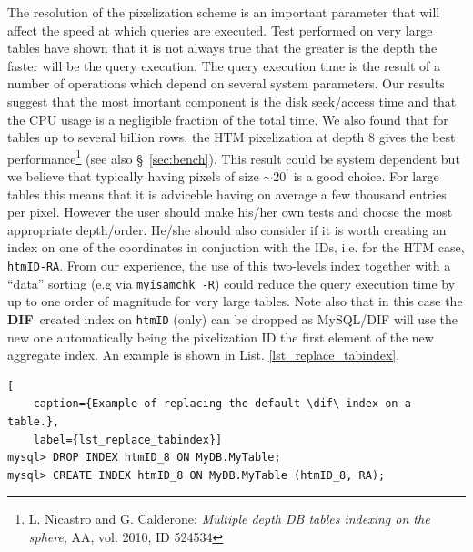 \documentclass[10pt,titlepage]{article}
\newcommand{\dif}{\textbf{\small DIF}}
\begin{document}
\noindent
The resolution of the pixelization scheme is an important parameter
that will affect the speed at which queries are executed.
Test performed on very large tables have shown that it is not always
true that the greater is the depth the faster will be the query execution.
The query execution time is the result of a number of
operations which depend on several system parameters.
Our results suggest that the most imortant component is the disk seek/access
time and that the CPU usage is a negligible fraction of the total time.
We also found that for tables up to several billion rows, the HTM pixelization
at depth 8 gives the best performance\footnote{L. Nicastro and G. Calderone:
\emph{Multiple depth DB tables indexing on the sphere}, AA, vol. 2010, ID 524534}
(see also \S\ \ref{sec:bench}). This result could be system dependent
but we believe that typically having pixels of size $\sim 20^\prime$ is a
good choice. For large tables this means
that it is adviceble having on average a few thousand entries per pixel.
However the user should make his/her own tests
and choose the most appropriate depth/order. He/she should also consider
if it is worth creating an index on one of the coordinates in conjuction with the
IDs, i.e. for the HTM case, \texttt{htmID-RA}. From our experience,
the use of this two-levels index together with a ``data'' sorting (e.g via
\texttt{myisamchk -R}) could reduce
the query execution time by up to one order of magnitude for very large tables.
Note also that in this case the \dif\ created index
on \texttt{htmID} (only) can be dropped as MySQL/DIF will use the new one
automatically being the pixelization ID the first element of the new
aggregate index. An example is shown in List. \ref{lst_replace_tabindex}.
%
\begin{lstlisting}[
    caption={Example of replacing the default \dif\ index on a table.},
    label={lst_replace_tabindex}]
mysql> DROP INDEX htmID_8 ON MyDB.MyTable;
mysql> CREATE INDEX htmID_8 ON MyDB.MyTable (htmID_8, RA);
\end{lstlisting}
\end{document}
